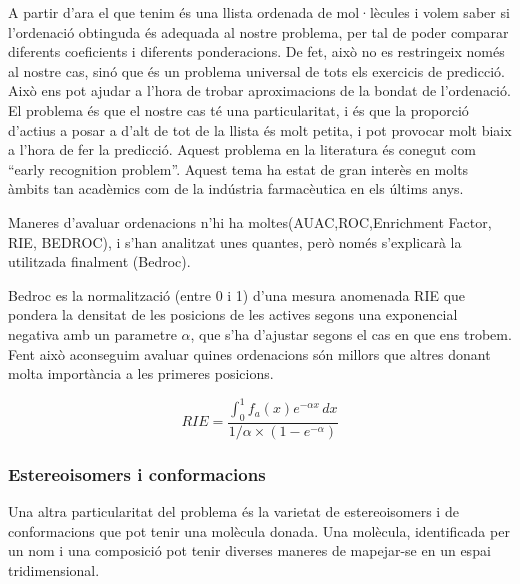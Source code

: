 
A partir d'ara el que tenim és una llista ordenada de mol·lècules i volem saber
si l'ordenació obtinguda és adequada al nostre problema, per tal de poder
comparar diferents coeficients i diferents ponderacions. De fet, això no es
restringeix només al nostre cas, sinó que és un problema universal de tots els
exercicis de predicció. Això ens pot ajudar a l'hora de trobar aproximacions de
la bondat de l'ordenació. El problema és que el nostre cas té una
particularitat, i és que la proporció d'actius a posar a d'alt de tot de la
llista és molt petita, i pot provocar molt biaix a l'hora de fer la predicció.
Aquest problema en la literatura és conegut com ``early recognition
problem''. Aquest tema ha estat de gran interès en molts àmbits tan acadèmics
com de la indústria farmacèutica en els últims anys.

Maneres d'avaluar ordenacions n'hi ha moltes(AUAC,ROC,Enrichment
Factor, RIE, BEDROC), i s'han analitzat unes quantes, però només
s'explicarà la utilitzada finalment (Bedroc).

Bedroc es la normalització (entre 0 i 1) d'una mesura anomenada RIE que pondera
la densitat de les posicions de les actives segons una exponencial negativa amb
un parametre $\alpha$, que s'ha d'ajustar segons el cas en que ens trobem.  Fent
això aconseguim avaluar quines ordenacions són millors que altres donant molta
importància a les primeres posicions.

$$ RIE =\frac{\int_{0}^{1} f_{a}(x)e^{-\alpha x}\, dx} { 1/\alpha \times (1-e^{-\alpha})}  $$


\subsubsection{Estereoisomers i conformacions}
\label{ssub:estereoisomers i conformacions}

Una altra particularitat del problema és la varietat de estereoisomers i de
conformacions que pot tenir una molècula donada.  Una molècula, identificada per
un nom i una composició pot tenir diverses maneres de mapejar-se en un espai
tridimensional.

